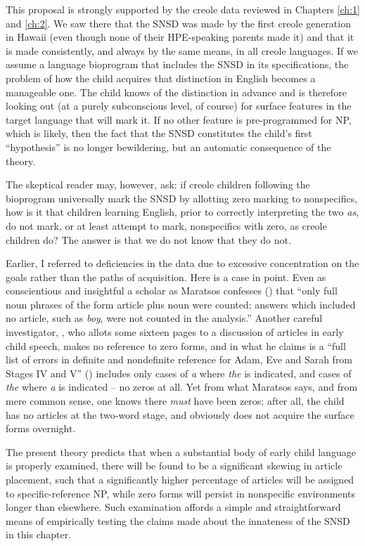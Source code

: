 This proposal is strongly supported by the creole data reviewed in Chapters \ref{ch:1} and \ref{ch:2}. We saw there that the SNSD was made by the first creole generation in Hawaii (even though none of their HPE-speaking parents made it) and that it is made consistently, and always by the same means, in all creole languages. If we assume a language bioprogram that includes the SNSD in its specifications, the problem of how the child acquires that distinction in English becomes a manageable one. The child knows of the distinction in advance and is therefore looking out (at a purely subconscious level, of course) for surface features in the target language that will mark it. If no other feature is pre-programmed for NP, which is likely, then the fact that the SNSD constitutes the child's first ``hypothesis'' is no longer bewildering, but an automatic consequence of the theory.

The skeptical reader may, however, ask: if creole children following the bioprogram universally mark the SNSD by allotting zero marking to nonspecifics, how is it that children learning English, prior to
correctly interpreting the two \textit{as}, do not mark, or at least attempt to mark, nonspecifics with zero, as creole children do? The answer is that we do not know that they do not.

Earlier, I referred to deficiencies in the data due to excessive concentration on the goals rather than the paths of acquisition. Here is a case in point. Even as conscientious and insightful a scholar as Maratsos confesses (\citeyear[450]{Maratsos1974}) that ``only full noun phrases of the form article plus noun were counted; answers which included no article, such as \textit{boy}, were not counted in the analysis.'' Another careful investigator, \citet{Brown1973}, who allots some sixteen pages to a discussion of articles in early child speech, makes no reference to zero forms, and in what he claims is a ``full list of errors in definite and nondefinite reference for Adam, Eve and Sarah from Stages IV and V'' (\citeyear[Table~51]{Brown1973}) includes only cases of \textit{a} where \textit{the} is indicated, and cases of \textit{the} where \textit{a} is indicated -- no zeros at all. Yet from what Maratsos says, and from mere common sense, one knows there \textit{must} have been zeros; after all, the child has no articles at the two-word stage, and obviously does not acquire the surface forms overnight.

The present theory predicts that when a substantial body of early child language is properly examined, there will be found to be a significant skewing in article placement, such that a significantly higher percentage of articles will be assigned to specific-reference NP, while zero forms will persist in nonspecific environments longer than elsewhere. Such examination affords a simple and straightforward means of empirically testing the claims made about the innateness of the SNSD in this chapter.\\\\


